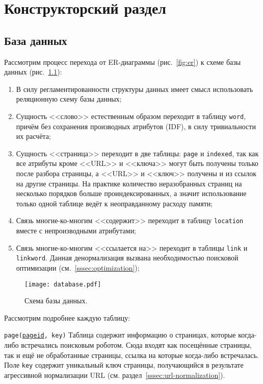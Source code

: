 \chapter{Конструкторский раздел}
\section{База данных}
Рассмотрим процесс перехода от ER-диаграммы (рис.~\ref{fig:er}) к схеме базы данных (рис.~\ref{fig:database}):
\begin{enumerate}
  \item В силу регламентированности структуры данных имеет смысл использовать реляционную схему базы данных;
  \item Сущность <<слово>> естественным образом переходит в таблицу \verb|word|, причём без сохранения производных атрибутов (IDF), в силу тривиальности их расчёта;
  \item Сущность <<страница>> переходит в две таблицы: \verb|page| и \verb|indexed|, так как все атрибуты кроме <<URL>> и <<ключа>> могут быть получены только после разбора страницы, а <<URL>> и <<ключ>> получены и из ссылок на другие страницы. На практике количество неразобранных страниц на несколько порядков больше проиндексированных, а значит использование только одной таблице ведёт к неоправданному расходу памяти;
  \item Связь многие-ко-многим <<содержит>> переходит в таблицу \verb|location| вместе с непроизводными атрибутами;
  \item Связь многие-ко-многим <<ссылается на>> переходит в таблицы \verb|link| и \verb|linkword|. Данная денормализация вызвана необходимостью поисковой оптимизации (см.~\ref{sssec:optimization});
\end{enumerate}

\begin{figure}[h]
  \centering
  \texttt{[image: database.pdf]}
  \caption{Схема базы данных.}
  \label{fig:database}
\end{figure}

Рассмотрим подробнее каждую таблицу:

\begin{definition}{\texttt{page(\underline{pageid}, key)}}
  Таблица содержит информацию о страницах, которые когда-либо встречались поисковым роботом. Сюда входят как посещённые страницы, так и ещё не обработанные страницы, ссылка на которые когда-либо встречалась. Поле \verb|key| содержит уникальный ключ страницы, получающийся в результате агрессивной нормализации URL (см. раздел~\ref{sssec:url-normalization}).
\end{definition}

